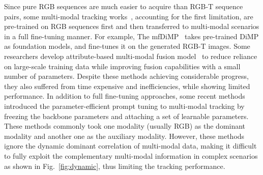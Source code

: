 \documentclass[letterpaper]{article} %
\begin{document}
Since pure RGB sequences are much easier to acquire than RGB-T sequence pairs, some multi-modal tracking works~\cite{DAPNet,DAFNet}, accounting for the first limitation, are pre-trained on RGB sequences first and then transferred to multi-modal scenarios in a full fine-tuning manner. For example, The mfDiMP~\cite{mfDimp} takes pre-trained DiMP as foundation models, and fine-tunes it on the generated RGB-T images. Some researchers develop attribute-based multi-modal fusion model~\cite{CAT,ADRNet,APFNet} to reduce reliance on large-scale training data while improving fusion capabilities with a small number of parameters. Despite these methods achieving considerable progress, they also suffered from time expensive and inefficiencies, while showing limited performance.
In addition to full fine-tuning approaches,
some recent methods~\cite{ProTrack,zhu2023visual} introduced the parameter-efficient prompt tuning to multi-modal tracking by freezing the backbone parameters and attaching a set of learnable parameters. These methods commonly took one modality (usually RGB) as the dominant modality and another one as the auxiliary modality. However, these methods ignore the dynamic dominant correlation of multi-modal data, making it difficult to fully exploit the complementary multi-modal information in complex scenarios as shown in Fig.~\ref{fig:dynamic}, thus limiting the tracking performance.
\end{document}
